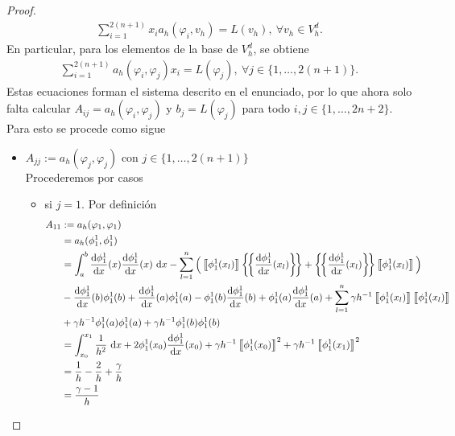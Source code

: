 \documentclass[10pt,a4paper]{report}
\newcommand{\dx}{\textup{d}x}
\providecommand{\Dx}[1]{\frac{\textup{d} #1}{\textup{d}x}}
\providecommand{\salto}[1]{\left\llbracket#1\right\rrbracket}
\providecommand{\prom}[1]{\left \{\!\left \{#1\right \}\!\right \}}
\begin{document}
\begin{proof}
        \begin{align*}
        	\sum_{i=1}^{2(n+1)}x_{i}a_{h}\left( \varphi_{i},v_{h}\right) = L(v_{h}),\ \forall v_{h}\in V^{d}_{h}.
        \end{align*} 
        En particular, para los elementos de la base de $V^{d}_{h}$, se obtiene
        \begin{align*}
        	\sum_{i=1}^{2(n+1)}a_{h}\left( \varphi_{i},\varphi_{j}\right)x_{i} = L(\varphi_{j}), \ \forall j\in\{1,\dots,2(n+1)\}.
        \end{align*}
        Estas ecuaciones forman el sistema descrito en el enunciado, por lo que ahora solo falta calcular $A_{ij} = a_{h}\left( \varphi_{i},\varphi_{j}\right)$ y $b_{j} = L(\varphi_{j})$ para todo $i,j\in\{1,\dots,2n+2\}$. Para esto se procede como sigue
        \begin{itemize}
        	\item $A_{jj} := a_{h}\left( \varphi_{j},\varphi_{j}\right)$ con $j\in\{1,\dots,2(n+1)\}$\\
        	Procederemos por casos
        	\begin{itemize}
        		\item si $j = 1$. Por definición
        		\begin{align*}
        			A_{11} &:= a_{h}(\varphi_{1},\varphi_{1})\\ &= a_{h}(\phi^{1}_{1},\phi^{1}_{1})\\ 
        			&= \int_{a}^{b} \Dx{\phi^{1}_{1}}(x)\Dx{\phi^{1}_{1}}(x)\ \dx - \sum_{l=1}^{n}\Big(\salto{\phi^{1}_{1}(x_{l})}\prom{\Dx{\phi^{1}_{1}}(x_{l})} + \prom{\Dx{\phi^{1}_{1}}(x_{l})}\salto{\phi^{1}_{1}(x_{l})}\Big)\\
        			&-\Dx{\phi^{1}_{1}}(b)\phi^{1}_{1}(b) + \Dx{\phi^{1}_{1}}(a)\phi^{1}_{1}(a) - \phi^{1}_{1}(b)\Dx{\phi^{1}_{1}}(b) + \phi^{1}_{1}(a)\Dx{\phi^{1}_{1}}(a) + \sum_{l=1}^{n}\gamma h^{-1}\salto{\phi^{1}_{1}(x_{l})}\salto{\phi^{1}_{1}(x_{l})}\\
        			&+ \gamma h^{-1}\phi^{1}_{1}(a)\phi^{1}_{1}(a) + \gamma h^{-1}\phi^{1}_{1}(b)\phi^{1}_{1}(b)\\
        			&= \int_{x_{0}}^{x_{1}}\frac{1}{h^{2}}\ \dx + 2\phi^{1}_{1}(x_{0})\Dx{\phi^{1}_{1}}(x_{0}) + \gamma h^{-1}\salto{\phi^{1}_{1}(x_{0})}^{2} + \gamma h^{-1}\salto{\phi^{1}_{1}(x_{1})}^{2}\\
        			&= \frac{1}{h} -\frac{2}{h} + \frac{\gamma}{h}\\
        			&= \frac{\gamma -1}{h}
        		\end{align*}

\end{itemize}
\end{itemize}
\end{proof}
\end{document}
